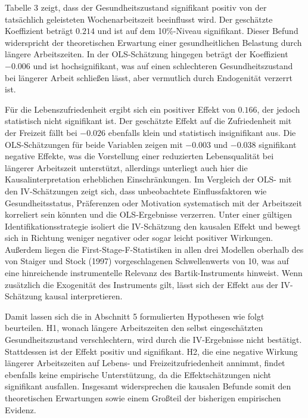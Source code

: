 \documentclass[12pt,a4paper]{article}
\begin{document}
Tabelle 3 zeigt, dass der Gesundheitszustand signifikant positiv von der tatsächlich geleisteten Wochenarbeitszeit beeinflusst wird. Der geschätzte Koeffizient beträgt $0.214$ und ist auf dem 10\%-Niveau signifikant. Dieser Befund widerspricht der theoretischen Erwartung einer gesundheitlichen Belastung durch längere Arbeitszeiten. In der OLS-Schätzung hingegen beträgt der Koeffizient $-0{.}006$ und ist hochsignifikant, was auf einen schlechteren Gesundheitszustand bei längerer Arbeit schließen lässt, aber vermutlich durch Endogenität verzerrt ist.

Für die Lebenszufriedenheit ergibt sich ein positiver Effekt von $0{.}166$, der jedoch statistisch nicht signifikant ist. Der geschätzte Effekt auf die Zufriedenheit mit der Freizeit fällt bei $-0{.}026$ ebenfalls klein und statistisch insignifikant aus. Die OLS-Schätzungen für beide Variablen zeigen mit $-0{.}003$ und $-0{.}038$ signifikant negative Effekte, was die Vorstellung einer reduzierten Lebensqualität bei längerer Arbeitszeit unterstützt, allerdings unterliegt auch hier die Kausalinterpretation erheblichen Einschränkungen.  Im Vergleich der OLS- mit den IV-Schätzungen zeigt sich, dass unbeobachtete Einflussfaktoren wie Gesundheitsstatus, Präferenzen oder Motivation systematisch mit der Arbeitszeit korreliert sein könnten und die OLS-Ergebnisse verzerren. Unter einer gültigen Identifikationsstrategie isoliert die IV-Schätzung den kausalen Effekt und bewegt sich in Richtung weniger negativer oder sogar leicht positiver Wirkungen. Außerdem liegen die First-Stage-F-Statistiken in allen drei Modellen oberhalb des von Staiger und Stock (1997) vorgeschlagenen Schwellenwerts von 10, was auf eine hinreichende instrumentelle Relevanz des Bartik-Instruments hinweist. Wenn zusätzlich die Exogenität des Instruments gilt, lässt sich der Effekt aus der IV-Schätzung kausal interpretieren.

Damit lassen sich die in Abschnitt 5 formulierten Hypothesen wie folgt beurteilen. H1, wonach längere Arbeitszeiten den selbst eingeschätzten Gesundheitszustand verschlechtern, wird durch die IV-Ergebnisse nicht bestätigt. Stattdessen ist der Effekt positiv und signifikant. H2, die eine negative Wirkung längerer Arbeitszeiten auf Lebens- und Freizeitzufriedenheit annimmt, findet ebenfalls keine empirische Unterstützung, da die Effektschätzungen nicht signifikant ausfallen. Insgesamt widersprechen die kausalen Befunde somit den theoretischen Erwartungen sowie einem Großteil der bisherigen empirischen Evidenz.
\end{document}
